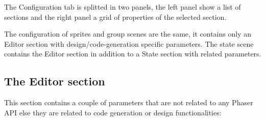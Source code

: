 \documentclass[letterpaper,10pt,english]{sphinxmanual}
\begin{document}
The Configuration tab is splitted in two panels, the left panel show a list of sections and the right panel a grid of properties of the selected section.

The configuration of sprites and group scenes are the same, it contains only an Editor section with design/code-generation specific parameters. The state scene contains the Editor section in addition to a State section with  related parameters.


\subsection{The Editor section}
\label{\detokenize{canvas:the-editor-section}}
This section contains a couple of parameters that are not related to any Phaser API else they are related to code generation or design functionalities:
\end{document}
